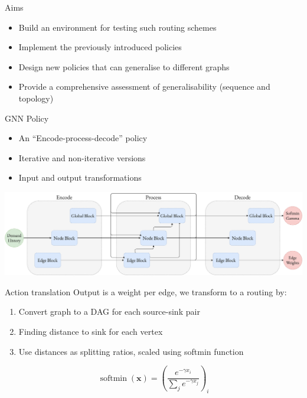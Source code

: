 \documentclass{beamer}
\begin{document}
\begin{frame}{Aims}
  \begin{itemize}
    \item Build an environment for testing such routing schemes
    \item Implement the previously introduced policies
    \item Design new policies that can generalise to different graphs
    \item Provide a comprehensive assessment of generalisability (sequence and topology)
  \end{itemize}
\end{frame}

\begin{frame}{GNN Policy}
  \begin{itemize}
    \item An ``Encode-process-decode''\cite{battaglia2018relational} policy
    \item Iterative and non-iterative versions
    \item Input and output transformations
  \end{itemize}
  \vspace{2em}
  \includegraphics[width=\textwidth]{figures/encode_process_decode.pdf}
\end{frame}

\begin{frame}{Action translation}
  Output is a weight per edge, we transform to a routing by:
  \begin{enumerate}
    \item Convert graph to a DAG for each source-sink pair
    \item Finding distance to sink for each vertex
    \item Use distances as splitting ratios, scaled using softmin function
  \end{enumerate}
  
  $$\operatorname{softmin}(\mathbf{x}) = \left( \frac{e^{- \gamma x_i}}{\sum_j{e^{- \gamma x_j}}} \right)_i$$
\end{frame}
\end{document}
